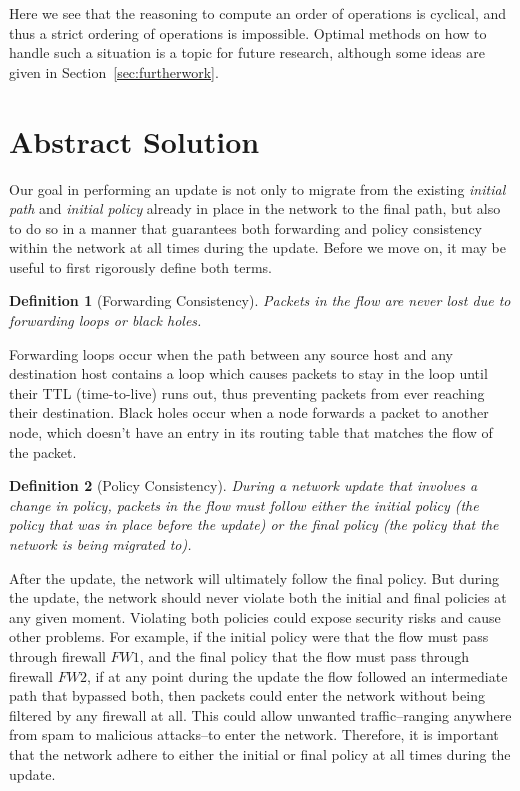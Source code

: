 \documentclass[pageno]{jpaper}
\newtheorem{defi}{Definition}
\begin{document}
Here we see that the reasoning to compute an order of operations is cyclical, and thus a strict ordering of operations is impossible. Optimal methods on how to handle such a situation is a topic for future research, although some ideas are given in Section~\ref{sec:furtherwork}.

\section{Abstract Solution}
\label{sec:solution}
Our goal in performing an update is not only to migrate from the existing \textit{initial path} and \textit{initial policy} already in place in the network to the final path, but also to do so in a manner that guarantees both forwarding and policy consistency within the network at all times during the update. Before we move on, it may be useful to first rigorously define both terms.

\begin{defi}[Forwarding Consistency]
Packets in the flow are never lost due to forwarding loops or black holes.
\end{defi}

Forwarding loops occur when the path between any source host and any destination host contains a loop which causes packets to stay in the loop until their TTL (time-to-live) runs out, thus preventing packets from ever reaching their destination. Black holes occur when a node forwards a packet to another node, which doesn’t have an entry in its routing table that matches the flow of the packet.

\begin{defi}[Policy Consistency]
During a network update that involves a change in policy, packets in the flow must follow either the initial policy (the policy that was in place before the update) or the final policy (the policy that the network is being migrated to).
\end{defi}

After the update, the network will ultimately follow the final policy. But during the update, the network should never violate both the initial and final policies at any given moment. Violating both policies could expose security risks and cause other problems. For example, if the initial policy were that the flow must pass through firewall $FW1$, and the final policy that the flow must pass through firewall $FW2$, if at any point during the update the flow followed an intermediate path that bypassed both, then packets could enter the network without being filtered by any firewall at all. This could allow unwanted traffic--ranging anywhere from spam to malicious attacks--to enter the network. Therefore, it is important that the network adhere to either the initial or final policy at all times during the update. \\
\end{document}

